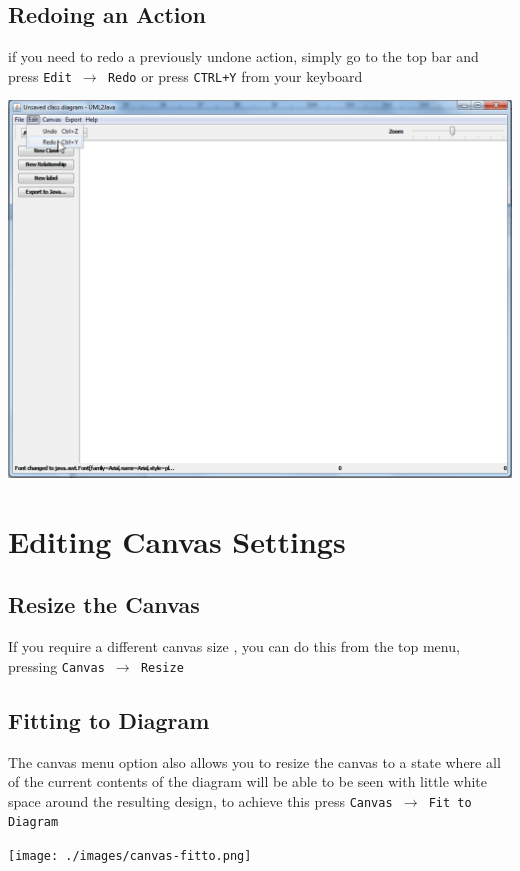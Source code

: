 \documentclass[a4paper]{article}
\begin{document}
\subsection{Redoing an Action} 
if you need to redo a previously undone action, simply go to the top bar and press \texttt{Edit $\rightarrow$ Redo} or press \texttt{CTRL+Y} from your keyboard
\begin{center} \includegraphics[trim = 0pt 500pt 0pt 0pt, clip, scale=0.45]{./images/edit-redo.png} \end{center}

\section{Editing Canvas Settings}
\subsection{Resize the Canvas} 
If you require a different canvas size , you can do this from the top menu, pressing \texttt{Canvas $\rightarrow$ Resize}
\newpage %

\subsection{Fitting to Diagram} 
The canvas menu option also allows you to resize the canvas to a state where all of the current contents of the diagram will be able to be seen with little white space around the resulting design, to achieve this press \texttt{Canvas $\rightarrow$ Fit to Diagram}
\begin{center} \texttt{[image: ./images/canvas-fitto.png]} \end{center}
\end{document}
